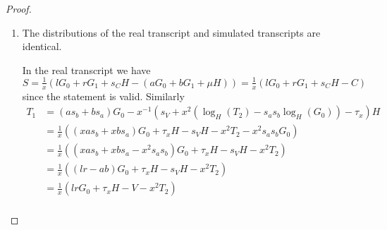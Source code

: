 \begin{proof}
\begin{enumerate}
\begin{innerproof}
\begin{enumerate}
     \end{enumerate}
    \end{innerproof}
  \item The distributions of the real transcript and simulated transcripts are identical.
  \begin{innerproof}
    In the real transcript we have $S = \frac{1}{x}(lG_0 + rG_1 + s_CH - (aG_0 + bG_1 + \mu H)) = \frac{1}{x}(lG_0 + rG_1 + s_CH - C)$ since the statement is valid. Similarly
      \begin{align*}
        T_1 &= (as_b + bs_a)G_0 - x^{-1}(s_V  + x^2(\log_H(T_2) - s_as_b\log_H(G_0)) - \tau_x)H\\
            &= \frac{1}{x}((xas_b + xbs_a)G_0 + \tau_xH - s_VH - x^2T_2 - x^2s_as_bG_0)\\
            &= \frac{1}{x}((xas_b + xbs_a - x^2s_as_b)G_0 + \tau_xH - s_VH - x^2T_2)\\
            &= \frac{1}{x}((lr - ab)G_0 + \tau_xH - s_VH - x^2T_2)\\
            &= \frac{1}{x}(lr G_0 + \tau_xH - V - x^2T_2)\\
      \end{align*}
  \end{innerproof}
 \end{enumerate}
\end{proof}